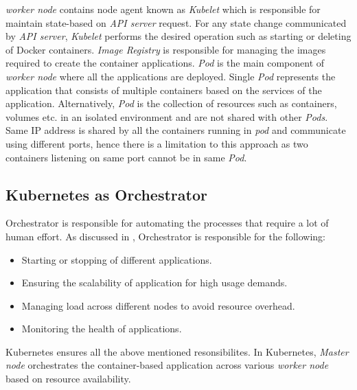 \emph{worker node} contains node agent known as \emph{Kubelet} which is responsible for maintain state-based on \emph{API server} request\cite{Santos2019}. For any state change communicated by \emph{API server}, \emph{Kubelet} performs the desired operation such as starting or deleting of Docker containers\cite{Santos2019}. \emph{Image Registry} is responsible for managing the images required to create the container applications. \emph{Pod} is the main component of \emph{worker node} where all the applications are deployed. Single \emph{Pod} represents the application that consists of multiple containers based on the services of the application. Alternatively, \emph{Pod} is the collection of resources such as containers, volumes etc. in an isolated environment and are not shared with other \emph{Pods}\cite{Santos2019}. Same IP address is shared by all the containers running in \emph{pod} and communicate using different ports, hence there is a limitation to this approach as two containers listening on same port cannot be in same \emph{Pod}\cite{Santos2019}.
\subsection{Kubernetes as Orchestrator}
\label{sec:k8s_orchestrator}
Orchestrator is responsible for automating the processes that require a lot of human effort. As discussed in \cite{containerjournal}, Orchestrator is responsible for the following:
\begin{itemize}
  \item Starting or stopping of different applications.
  \item Ensuring the scalability of application for high usage demands.
  \item Managing load across different nodes to avoid resource overhead.
  \item Monitoring the health of applications.
\end{itemize}
Kubernetes ensures all the above mentioned resonsibilites. In Kubernetes, \emph{Master node} orchestrates the container-based application across various \emph{worker node} based on resource availability\cite{k8s}.
